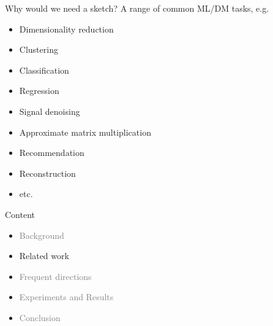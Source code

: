 \documentclass[first=dgreen,second=purple,logo=redque]{aaltoslides}
\begin{document}


\begin{frame}{Why would we need a sketch?}
A range of common ML/DM tasks, e.g.
\begin{itemize}
	\item Dimensionality reduction
	\item Clustering
	\item Classification
	\item Regression
	\item Signal denoising
	\item Approximate matrix multiplication
	\item Recommendation
	\item Reconstruction
	\item etc.
\end{itemize}
\end{frame}


\begin{frame}{Content}
\begin{itemize}
\item \textcolor{gray}{Background}
\item Related work
\item \textcolor{gray}{Frequent directions}
\item \textcolor{gray}{Experiments and Results}
\item \textcolor{gray}{Conclusion}
\end{itemize}
\end{frame}
\end{document}
